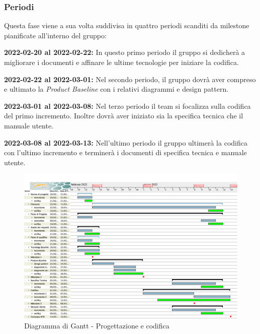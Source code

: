 \subsubsection{Periodi}

Questa fase viene a sua volta suddivisa in quattro periodi scanditi da milestone pianificate all'interno del gruppo:

\textbf{2022-02-20 al 2022-02-22:} In questo primo periodo il gruppo si dedicherà a migliorare i documenti e affinare le ultime tecnologie per iniziare la codifica.

\textbf{2022-02-22 al 2022-03-01:} Nel secondo periodo,  il gruppo dovrà aver compreso e ultimato la \textit{Product Baseline} con i relativi diagrammi e design pattern.

\textbf{2022-03-01 al 2022-03-08:} Nel terzo periodo il team si focalizza sulla codifica del primo incremento.  Inoltre dovrà aver iniziato sia la specifica tecnica che il manuale utente.

\textbf{2022-03-08 al 2022-03-13:} Nell'ultimo periodo il gruppo ultimerà la codifica con l’ultimo incremento e terminerà i documenti di specifica tecnica e manuale utente.

\begin{figure}[H]
\centering
\includegraphics[scale=0.35]{Sezioni/gantt/progettazione_codifica.png}
\caption{Diagramma di Gantt - Progettazione e codifica}
\end{figure}